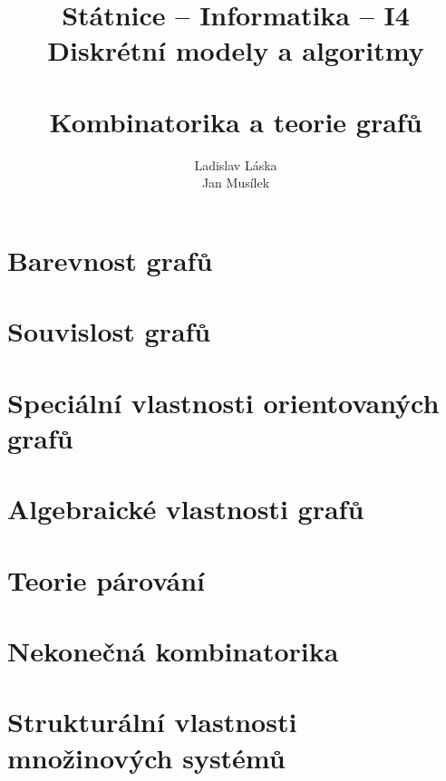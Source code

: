 \documentclass[a4paper,12pt,titlepage]{article}
\title{Státnice -- Informatika -- I4\\ Diskrétní modely a algoritmy\\ ~\\ Kombinatorika a teorie grafů}
\author{Ladislav Láska\\ Jan Musílek}
\begin{document}
\maketitle
\newpage
\tableofcontents
\newpage

\section{Barevnost grafů}



\section{Souvislost grafů}
\section{Speciální vlastnosti orientovaných grafů}
\section{Algebraické vlastnosti grafů}
\section{Teorie párování}



\section{Nekonečná kombinatorika}
\section{Strukturální vlastnosti množinových systémů}
\end{document}
